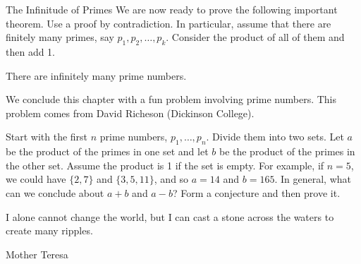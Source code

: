 \begin{section}{The Infinitude of Primes}
We are now ready to prove the following important theorem. Use a proof by contradiction. In particular, assume that there are finitely many primes, say $p_1, p_2,\ldots,p_k$.  Consider the product of all of them and then add 1.

\begin{theorem}\label{thm:infprimes}
There are infinitely many prime numbers.
\end{theorem}

We conclude this chapter with a fun problem involving prime numbers.  This problem comes from David Richeson (Dickinson College).  %

\begin{problem}
Start with the first $n$ prime numbers, $p_1,\ldots, p_n$. Divide them into two sets. Let $a$ be the product of the primes in one set and let $b$ be the product of the primes in the other set. Assume the product is 1 if the set is empty. For example, if $n=5$, we could have $\{2,7\}$ and $\{3,5,11\}$, and so $a=14$ and $b=165$. In general, what can we conclude about $a+b$ and $a-b$? Form a conjecture and then prove it.
\end{problem}

\epigraph{I alone cannot change the world, but I can cast a stone across the waters to create many ripples.}{Mother Teresa}

\end{section}